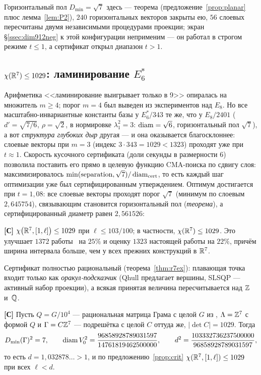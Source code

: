Горизонтальный пол $D_{\min}=\sqrt7$ здесь --- теорема
(предложение~\ref{prop:planar} плюс лемма~\ref{lem:P2}), $240$ горизонтальных
векторов закрыты ею, $56$ слоевых пересчитаны двумя независимыми процедурами
проекции; экран \S\ref{ssec:dim912neg} к этой конфигурации неприменим --- он
работал в строгом режиме $t\le1$, а сертификат открыл диапазон $t>1$.

\subsection{$\chi(\mathbb{R}^7)\le1029$: ламинирование $E_6^*$}\label{ssec:dim7}

Арифметика <<ламинирование выигрывает только в 9>> опиралась на множитель
$m\ge4$; порог $m=4$ был выведен из экспериментов над $E_8$. Но все
масштабно-инвариантные константы базы у $E_6^*/343$ те же, что у $E_8/2401$
($d'=\sqrt{7/6}$, $\rho=\sqrt2$, в нормировке $\lambda_1^2=3$: $\operatorname{diam}=\sqrt6$,
горизонтальный пол $\sqrt7$), а вот \emph{структура глубоких дыр} другая --- и
она оказывается благосклоннее: слоевые векторы при $m=3$ (индекс
$3\cdot343=1029<1323$) проходят уже при $t\approx1$. Скорость кусочного
сертификата (доли секунды в размерности $6$) позволила поставить его прямо в
целевую функцию CMA-поиска по сдвигу слоя: максимизировалось
$\min(\text{separation},\sqrt7)/\operatorname{diam}_{\text{cert}}$, то есть каждый шаг
оптимизации уже был сертифицированным утверждением. Оптимум достигается при
$t=1{,}08$: все слоевые векторы проходят порог $\sqrt7$ (минимум по слоевым
$2{,}645754$), связывающим становится горизонтальный пол (\emph{теорема}), а
сертифицированный диаметр равен $2{,}561526$:

\begin{keybox}
\textbf{[С]} $\chi\bigl(\mathbb{R}^7,[1,\ell]\bigr)\le1029$ при $\ell\le103/100$;
в частности, $\chi(\mathbb{R}^7)\le1029$. Это улучшает $1372$ работы~\cite{ABPR} на
$25\%$ и оценку $1323$ настоящей работы на $22\%$, причём ширина интервала
больше, чем у всех прежних конструкций в $\mathbb{R}^7$.
\end{keybox}

Сертификат полностью рациональный (теорема~\ref{thm:r7ex}): плавающая точка
входит только как \emph{оракул-подсказчик} (Qhull предлагает вершины, SLSQP ---
активный набор проекции), а всякая принятая величина пересчитывается над $\mathbb{Z}$
и~$\mathbb{Q}$.

\begin{theorem}\label{thm:r7ex}
\textbf{[С]} Пусть $Q=G/10^4$ --- рациональная матрица Грама с целой $G$ из
, $\Lambda=\mathbb{Z}^7$ с формой $Q$ и
$\Gamma=C\mathbb{Z}^7$ --- подрешётка с целой $C$ оттуда же, $|\det C|=1029$. Тогда
\[
D_{\min}(\Gamma)^2=7,\qquad
\operatorname{diam} V_0^2=\frac{96858928789031597}{14761819462500000},\qquad
d^2=\frac{103332736237500000}{96858928789031597},
\]
то есть $d=1{,}032878\ldots>1$, и по предложению~\ref{prop:crit}
$\chi(\mathbb{R}^7,[1,\ell])\le1029$ при всех $\ell<d$.
\end{theorem}

